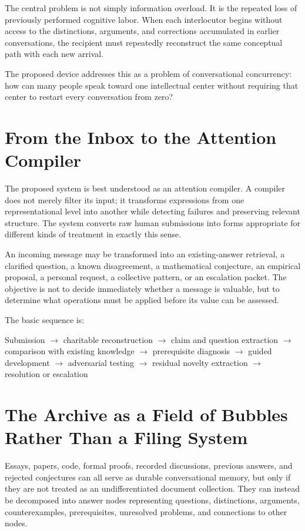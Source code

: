 \documentclass[11pt]{article}
\begin{document}
The central problem is not simply information overload. It is the repeated loss of previously performed cognitive labor. When each interlocutor begins without access to the distinctions, arguments, and corrections accumulated in earlier conversations, the recipient must repeatedly reconstruct the same conceptual path with each new arrival.

The proposed device addresses this as a problem of conversational concurrency: how can many people speak toward one intellectual center without requiring that center to restart every conversation from zero?

\section{From the Inbox to the Attention Compiler}

The proposed system is best understood as an attention compiler. A compiler does not merely filter its input; it transforms expressions from one representational level into another while detecting failures and preserving relevant structure. The system converts raw human submissions into forms appropriate for different kinds of treatment in exactly this sense.

An incoming message may be transformed into an existing-answer retrieval, a clarified question, a known disagreement, a mathematical conjecture, an empirical proposal, a personal request, a collective pattern, or an escalation packet. The objective is not to decide immediately whether a message is valuable, but to determine what operations must be applied before its value can be assessed.

The basic sequence is:

\begin{center}
Submission $\rightarrow$ charitable reconstruction $\rightarrow$ claim and question extraction $\rightarrow$ comparison with existing knowledge $\rightarrow$ prerequisite diagnosis $\rightarrow$ guided development $\rightarrow$ adversarial testing $\rightarrow$ residual novelty extraction $\rightarrow$ resolution or escalation
\end{center}

\section{The Archive as a Field of Bubbles Rather Than a Filing System}

Essays, papers, code, formal proofs, recorded discussions, previous answers, and rejected conjectures can all serve as durable conversational memory, but only if they are not treated as an undifferentiated document collection. They can instead be decomposed into answer nodes representing questions, distinctions, arguments, counterexamples, prerequisites, unresolved problems, and connections to other nodes.
\end{document}
